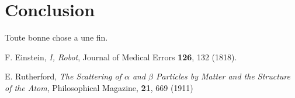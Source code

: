 \documentclass[11pt]{article}
\begin{document}
\section{Conclusion}

Toute bonne chose a une fin.


\begin{thebibliography}{9}

F. Einstein, {\it I, Robot}, Journal of Medical Errors {\bf 126}, 132 (1818).

E. Rutherford, {\it The Scattering of $\alpha$ and $\beta$ Particles by Matter and the Structure of the Atom}, Philosophical Magazine, \textbf{21}, 669 (1911)


\end{thebibliography}
\end{document}
